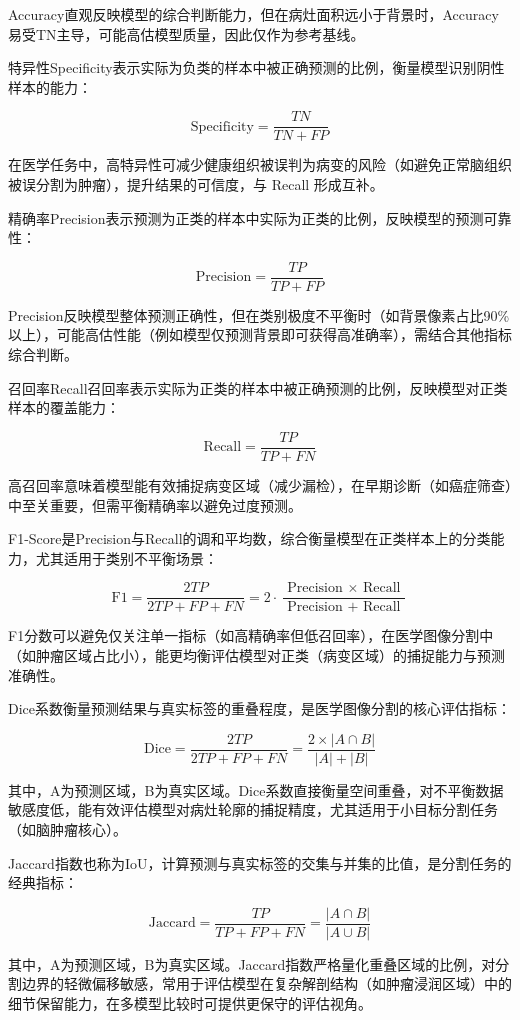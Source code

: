 Accuracy直观反映模型的综合判断能力，但在病灶面积远小于背景时，Accuracy易受TN主导，可能高估模型质量，因此仅作为参考基线。

特异性Specificity表示实际为负类的样本中被正确预测的比例，衡量模型识别阴性样本的能力：

\begin{equation}
    \mathrm{Specificity}=\frac{T N}{T N+F P}
\end{equation}

在医学任务中，高特异性可减少健康组织被误判为病变的风险（如避免正常脑组织被误分割为肿瘤），提升结果的可信度，与 Recall 形成互补。

精确率Precision表示预测为正类的样本中实际为正类的比例，反映模型的预测可靠性：

\begin{equation}
    \mathrm{Precision}=\frac{T P}{T P+F P}
\end{equation}

Precision反映模型整体预测正确性，但在类别极度不平衡时（如背景像素占比90\%以上），可能高估性能（例如模型仅预测背景即可获得高准确率），需结合其他指标综合判断。

召回率Recall召回率表示实际为正类的样本中被正确预测的比例，反映模型对正类样本的覆盖能力：

\begin{equation}
    \mathrm{Recall}=\frac{T P}{T P+F N} 
\end{equation}

高召回率意味着模型能有效捕捉病变区域（减少漏检），在早期诊断（如癌症筛查）中至关重要，但需平衡精确率以避免过度预测。

F1-Score是Precision与Recall的调和平均数，综合衡量模型在正类样本上的分类能力，尤其适用于类别不平衡场景：

\begin{equation}
    \mathrm{F} 1=\frac{2 T P}{2 T P+F P+F N}=2 \cdot \frac{\text { Precision } \times \text { Recall }}{\text { Precision }+ \text { Recall }}
\end{equation}

F1分数可以避免仅关注单一指标（如高精确率但低召回率），在医学图像分割中（如肿瘤区域占比小），能更均衡评估模型对正类（病变区域）的捕捉能力与预测准确性。

Dice系数衡量预测结果与真实标签的重叠程度，是医学图像分割的核心评估指标：

\begin{equation}
    \mathrm{Dice}=\frac{2 T P}{2 T P+F P+F N}=\frac{2 \times|A \cap B|}{|A|+|B|}
\end{equation}

其中，A为预测区域，B为真实区域。Dice系数直接衡量空间重叠，对不平衡数据敏感度低，能有效评估模型对病灶轮廓的捕捉精度，尤其适用于小目标分割任务（如脑肿瘤核心）。

Jaccard指数也称为IoU，计算预测与真实标签的交集与并集的比值，是分割任务的经典指标：

\begin{equation}
    \mathrm{Jaccard}=\frac{T P}{T P+F P+F N}=\frac{|A \cap B|}{|A \cup B|}
\end{equation}

其中，A为预测区域，B为真实区域。Jaccard指数严格量化重叠区域的比例，对分割边界的轻微偏移敏感，常用于评估模型在复杂解剖结构（如肿瘤浸润区域）中的细节保留能力，在多模型比较时可提供更保守的评估视角。